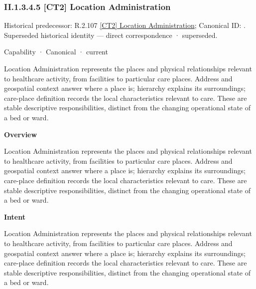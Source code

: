 \subsubsection*{II.1.3.4.5 [CT2] Location Administration}
\label{navigation:II.1.3.4.5}

{\small Historical predecessor: R.2.107 \hyperref[element:d412aff3a5c64e6aaba910d4c2c9356d]{[CT2] Location Administration}; Canonical ID: \texttt{}. Superseded historical identity — direct correspondence · superseded.}\par
\label{element:c410005667444f99a221483bf577fad2}
{\small Capability · Canonical · current}\par

Location Administration represents the places and physical relationships relevant to healthcare activity, from facilities to particular care places. Address and geospatial context answer where a place is; hierarchy explains its surroundings; care-place definition records the local characteristics relevant to care. These are stable descriptive responsibilities, distinct from the changing operational state of a bed or ward.



\textbf{Overview}



Location Administration represents the places and physical relationships relevant to healthcare activity, from facilities to particular care places. Address and geospatial context answer where a place is; hierarchy explains its surroundings; care-place definition records the local characteristics relevant to care. These are stable descriptive responsibilities, distinct from the changing operational state of a bed or ward.



\textbf{Intent}



Location Administration represents the places and physical relationships relevant to healthcare activity, from facilities to particular care places. Address and geospatial context answer where a place is; hierarchy explains its surroundings; care-place definition records the local characteristics relevant to care. These are stable descriptive responsibilities, distinct from the changing operational state of a bed or ward.



